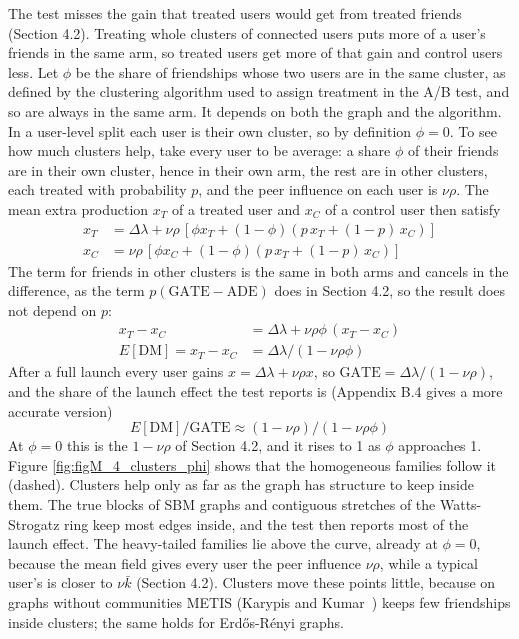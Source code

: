 \documentclass[final,5p,times,twocolumn,number]{elsarticle}
\begin{document}
The test misses the gain that treated users would get from treated friends (Section 4.2). Treating whole clusters of connected users puts more of a user's friends in the same arm, so treated users get more of that gain and control users less. Let $\phi$  be the share of friendships whose two users are in the same cluster, as defined by the clustering algorithm used to assign treatment in the A/B test, and so are always in the same arm. It depends on both the graph and the algorithm. In a user-level split each user is their own cluster, so by definition $\phi = 0$. To see how much clusters help, take every user to be average: a share $\phi$  of their friends are in their own cluster, hence in their own arm, the rest are in other clusters, each treated with probability $p$, and the peer influence on each user is $\nu\rho$. The mean extra production $x_T$  of a treated user and $x_C$  of a control user then satisfy
\begin{equation}\begin{aligned}x_T &= \Delta\lambda + \nu\rho\,[\phi x_T + (1 - \phi)(p\,x_T + (1 - p)\,x_C)]\\ x_C &= \nu\rho\,[\phi x_C + (1 - \phi)(p\,x_T + (1 - p)\,x_C)]\end{aligned}\label{eq:meanfield}\end{equation}
The term for friends in other clusters is the same in both arms and cancels in the difference, as the term $p(\mathrm{GATE} - \mathrm{ADE})$  does in Section 4.2, so the result does not depend on $p$:
\begin{equation}\begin{aligned}x_T - x_C &= \Delta\lambda + \nu\rho\phi\,(x_T - x_C)\\ E[\mathrm{DM}] = x_T - x_C &= \Delta\lambda/(1 - \nu\rho\phi)\end{aligned}\label{eq:dmcluster}\end{equation}
After a full launch every user gains $x = \Delta\lambda + \nu\rho x$, so $\mathrm{GATE} = \Delta\lambda/(1 - \nu\rho)$, and the share of the launch effect the test reports is (Appendix B.4 gives a more accurate version)
\begin{equation}E[\mathrm{DM}]/\mathrm{GATE} \approx (1 - \nu\rho)/(1 - \nu\rho\phi)\label{eq:cluster}\end{equation}
At $\phi = 0$  this is the $1 - \nu\rho$  of Section 4.2, and it rises to 1 as $\phi$  approaches 1. Figure \ref{fig:figM_4_clusters_phi} shows that the homogeneous families follow it (dashed). Clusters help only as far as the graph has structure to keep inside them. The true blocks of SBM graphs and contiguous stretches of the Watts-Strogatz ring keep most edges inside, and the test then reports most of the launch effect. The heavy-tailed families lie above the curve, already at $\phi = 0$, because the mean field gives every user the peer influence $\nu\rho$, while a typical user's is closer to $\nu\bar k$  (Section 4.2). Clusters move these points little, because on graphs without communities METIS (Karypis and Kumar~\cite{r15}) keeps few friendships inside clusters; the same holds for Erdős-Rényi graphs.
\end{document}
